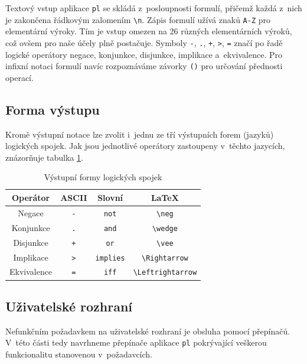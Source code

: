 \documentclass[thesis=B,czech,hidelinks]{thesis}[2012/06/26]
\begin{document}
Textový vstup aplikace \texttt{pl} se skládá z~posloupnosti formulí, přičemž každá z~nich je zakončena řádkovým zalomením \texttt{\textbackslash n}. Zápis formulí užívá znaků \texttt{A-Z} pro elementární výroky. Tím je vstup omezen na 26 různých elementárních výroků, což ovšem pro naše účely plně postačuje. Symboly \texttt{-}, \texttt{.}, \texttt{+}, \texttt{>}, \texttt{=} značí po řadě logické operátory negace, konjunkce, disjunkce, implikace a~ekvivalence. Pro infixní notaci formulí navíc rozpoznáváme závorky \texttt{()} pro určování přednosti operací.

\subsection{Forma výstupu}

Kromě výstupní notace lze zvolit i~jednu ze tří výstupních forem (jazyků) logických spojek. Jak jsou jednotlivé operátory zastoupeny v~těchto jazycích, znázorňuje tabulka \ref{tab:connectives_language}.

\begin{table}
\centering
\caption{Výstupní formy logických spojek}
\label{tab:connectives_language}
\begin{tabular}{|c||c|c|c|}\hline
Operátor & ASCII & Slovní & \LaTeX \tabularnewline \hline \hline
Negace & \verb|-| & \verb|not| & \verb|\neg| \tabularnewline \hline
Konjunkce & \verb|.| & \verb|and| & \verb|\wedge| \tabularnewline \hline
Disjunkce & \verb|+| & \verb|or| & \verb|\vee| \tabularnewline \hline
Implikace & \verb|>| & \verb|implies| & \verb|\Rightarrow| \tabularnewline \hline
Ekvivalence & \verb|=| & \verb|iff| & \verb|\Leftrightarrow| \tabularnewline \hline
\end{tabular}
\end{table}

\subsection{Uživatelské rozhraní}

Nefunkčním požadavkem na uživatelské rozhraní je obsluha pomocí přepínačů. V~této části tedy navrhneme přepínače aplikace \texttt{pl} pokrývající veškerou funkcionalitu stanovenou v~požadavcích. 
\end{document}
